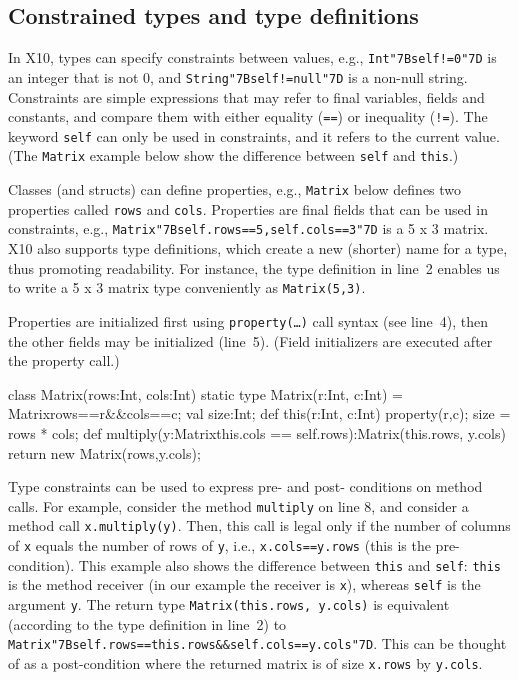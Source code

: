 \documentclass[a4paper]{article}
\def\codesmaller{\small}
\newcommand{\code}[1]{\texttt{\textup{\codesmaller #1}}}
\newcommand{\ttlcb}{\texttt{\char "7B}}
\newcommand{\ttrcb}{\texttt{\char "7D}}
\newcommand{\lb}{\ttlcb}
\newcommand{\rb}{\ttrcb}
\begin{document}
\subsection{Constrained types and type definitions}
In X10, types can specify constraints between values,
    e.g., \code{Int\lb{}self!=0\rb{}} is an integer that is not 0,
        and \code{String\lb{}self!=null\rb{}} is a non-null string.
Constraints are simple expressions that may refer to final variables, fields and constants,
    and compare them with either equality (\code{==}) or inequality (\code{!=}).
The keyword \code{self} can only be used in constraints, and it refers to the current value.
(The \code{Matrix} example below show the difference between \code{self} and \code{this}.)

Classes (and structs) can define properties,
    e.g., \code{Matrix} below defines two properties called \code{rows} and \code{cols}.
Properties are final fields that can be used in constraints, e.g.,
    \code{Matrix\lb{}self.rows==5,self.cols==3\rb{}} is a 5 x 3 matrix.
X10 also supports type definitions, which create a new (shorter) name for a type, thus promoting readability.
For instance, the type definition in line~2 enables us to write a 5 x 3 matrix type conveniently as \code{Matrix(5,3)}.

Properties are initialized first using \code{property(\ldots)} call syntax (see line~4),
    then the other fields may be initialized (line~5).
(Field initializers are executed after the property call.)

\begin{xten}
class Matrix(rows:Int, cols:Int) {
  static type Matrix(r:Int, c:Int) = Matrix{rows==r&&cols==c};
  val size:Int;
  def this(r:Int, c:Int) {
    property(r,c);
    size = rows * cols;
  }
  def multiply(y:Matrix{this.cols == self.rows}):Matrix(this.rows, y.cols) {
    return new Matrix(rows,y.cols);
  }
}
\end{xten}

Type constraints can be used to express pre- and post- conditions on method calls.
For example, consider the method \code{multiply} on line 8,
    and consider a method call \code{x.multiply(y)}.
Then, this call is legal only if the number of columns of \code{x} equals the number of rows of \code{y},
    i.e., \code{x.cols==y.rows} (this is the pre-condition).
This example also shows the difference between \code{this} and \code{self}:
    \code{this} is the method receiver (in our example the receiver is \code{x}),
    whereas \code{self} is the argument \code{y}.
The return type \code{Matrix(this.rows, y.cols)} is equivalent (according to the type definition in line~2)
    to %
    \code{Matrix\lb{}self.rows==this.rows\&\&self.cols==y.cols\rb{}}.
This can be thought of as a post-condition where the returned matrix is of size \code{x.rows} by \code{y.cols}.
\end{document}
